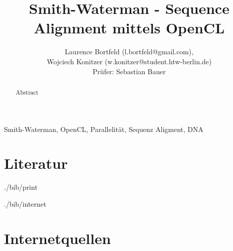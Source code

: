 \documentclass[journal]{IEEEtran}
\begin{document}
\title{Smith-Waterman - Sequence Alignment mittels OpenCL}
\author{
  Laurence Bortfeld (l.bortfeld@gmail.com), \\
  Wojciech Konitzer (w.konitzer@student.htw-berlin.de) \\
  Prüfer: Sebastian Bauer
}

\maketitle

\begin{abstract}
Abstract
\end{abstract}

\begin{IEEEkeywords}
Smith-Waterman, OpenCL, Parallelität, Sequenz Aligment, DNA
\end{IEEEkeywords}




\section*{Literatur}

\begin{btSect}{./bib/print}
\btPrintCited
\end{btSect}

\begin{btSect}{./bib/internet}
\section*{Internetquellen}
\btPrintCited
\end{btSect}
\end{document}
